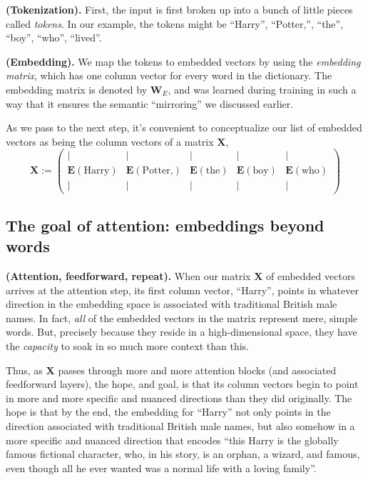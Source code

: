 \documentclass{article}
\begin{document}
\textbf{(Tokenization).} First, the input is first broken up into a bunch of little pieces called \textit{tokens}. In our example, the tokens might be ``Harry'', ``Potter,'', ``the'', ``boy'', ``who'', ``lived''.

\textbf{(Embedding).} We map the tokens to embedded vectors by using the \textit{embedding matrix}, which has one column vector for every word in the dictionary. The embedding matrix is denoted by $\mathbf{W}_E$, and was learned during training in such a way that it ensures the semantic ``mirroring'' we discussed earlier.

As we pass to the next step, it's convenient to conceptualize our list of embedded vectors as being the column vectors of a matrix $\mathbf{X}$,
$$
\mathbf{X} := \begin{pmatrix} | & | & | & | & | \\ \mathbf{E}(\text{Harry}) & \mathbf{E}(\text{Potter,}) & \mathbf{E}(\text{the}) & \mathbf{E}(\text{boy}) & \mathbf{E}(\text{who}) \\ | & | & | & | & | \end{pmatrix}
$$

\subsection*{The goal of attention: embeddings beyond words}

\textbf{(Attention, feedforward, repeat).} When our matrix $\mathbf{X}$ of embedded vectors arrives at the attention step, its first column vector, ``Harry'', points in whatever direction in the embedding space is associated with traditional British male names. In fact, \textit{all} of the embedded vectors in the matrix represent mere, simple words. But, precisely because they reside in a high-dimensional space, they have the \textit{capacity} to soak in so much more context than this.

Thus, as $\mathbf{X}$ passes through more and more attention blocks (and associated feedforward layers), the hope, and goal, is that its column vectors begin to point in more and more specific and nuanced directions than they did originally. The hope is that by the end, the embedding for ``Harry'' not only points in the direction associated with traditional British male names, but also somehow in a more specific and nuanced direction that encodes ``this Harry is the globally famous fictional character, who, in his story, is an orphan, a wizard, and famous, even though all he ever wanted was a normal life with a loving family''.
\end{document}
